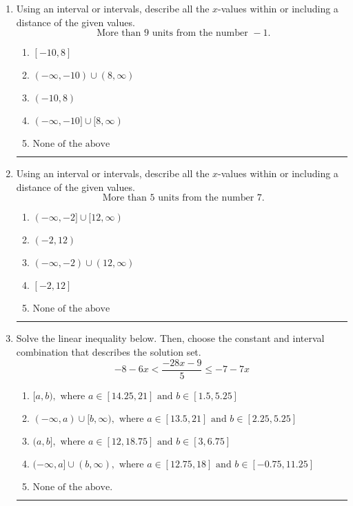 \documentclass[14pt]{extbook}
\newcommand{\litem}[1]{\item#1\hspace*{-1cm}\rule{\textwidth}{0.4pt}}
\begin{document}
\begin{enumerate}
\litem{
Using an interval or intervals, describe all the $x$-values within or including a distance of the given values.\[ \text{ More than } 9 \text{ units from the number } -1. \]\begin{enumerate}[label=\Alph*.]
\item \( [-10, 8] \)
\item \( (-\infty, -10) \cup (8, \infty) \)
\item \( (-10, 8) \)
\item \( (-\infty, -10] \cup [8, \infty) \)
\item \( \text{None of the above} \)

\end{enumerate} }
\litem{
Using an interval or intervals, describe all the $x$-values within or including a distance of the given values.\[ \text{ More than } 5 \text{ units from the number } 7. \]\begin{enumerate}[label=\Alph*.]
\item \( (-\infty, -2] \cup [12, \infty) \)
\item \( (-2, 12) \)
\item \( (-\infty, -2) \cup (12, \infty) \)
\item \( [-2, 12] \)
\item \( \text{None of the above} \)

\end{enumerate} }
\litem{
Solve the linear inequality below. Then, choose the constant and interval combination that describes the solution set.\[ -8 - 6 x < \frac{-28 x - 9}{5} \leq -7 - 7 x \]\begin{enumerate}[label=\Alph*.]
\item \( [a, b), \text{ where } a \in [14.25, 21] \text{ and } b \in [1.5, 5.25] \)
\item \( (-\infty, a) \cup [b, \infty), \text{ where } a \in [13.5, 21] \text{ and } b \in [2.25, 5.25] \)
\item \( (a, b], \text{ where } a \in [12, 18.75] \text{ and } b \in [3, 6.75] \)
\item \( (-\infty, a] \cup (b, \infty), \text{ where } a \in [12.75, 18] \text{ and } b \in [-0.75, 11.25] \)
\item \( \text{None of the above.} \)


\end{enumerate}}
\end{enumerate}
\end{document}
